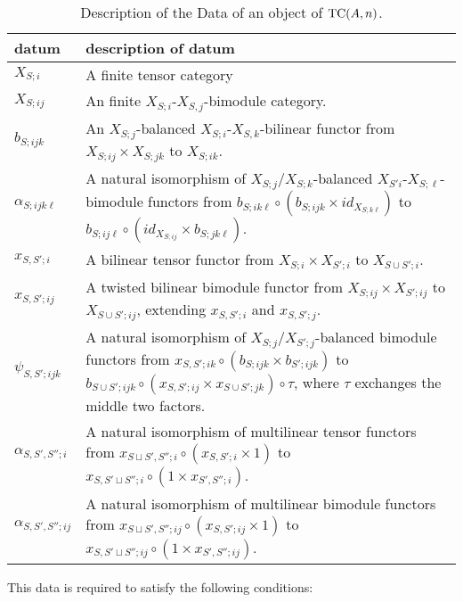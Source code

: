 \documentclass[a4paper]{amsart}
\begin{document}
\begin{table}[ht]
	\caption{Description of the Data of an object of $\mathrm{TC}(A,n)$.}	
	\begin{tabular}{l p{11cm}}
		datum & description of datum \\ \hline
		$X_{S;i}$ & A finite tensor category \\
		$X_{S;ij}$ & An finite $X_{S;i}$-$X_{S,j}$-bimodule category. \\
		$b_{S; ijk}$ & An $X_{S;j}$-balanced $X_{S;i}$-$X_{S,k}$-bilinear functor from $X_{S;ij}\times X_{S;jk}$ to $X_{S;ik}$. \\
		$\alpha_{S;ijk \ell}$  & A natural isomorphism of $X_{S;j}$/$X_{S;k}$-balanced $X_{S'i}$-$X_{S;\ell}$-bimodule functors from $b_{S;i k \ell} \circ (b_{S;ijk} \times id_{X_{S;k\ell}})$ to $b_{S;ij \ell} \circ (id_{X_{S;ij}} \times b_{S;jk\ell})$. \\ \hline
		$x_{S, S';i}$ & A bilinear tensor functor from $X_{S;i} \times X_{S';i}$ to $X_{S \cup S'; i}$. \\
		$x_{S, S';ij}$ & A twisted bilinear bimodule functor from $X_{S;ij} \times X_{S';ij}$ to $X_{S \cup S'; ij}$, extending $x_{S, S';i}$ and $x_{S, S';j}$. \\
		$\psi_{S, S'; i j k}$ & A natural isomorphism of $X_{S;j} / X_{S';j}$-balanced bimodule functors from $x_{S,S'; ik} \circ (b_{S; ijk} \times b_{S';ijk})$ to $b_{S \cup S'; ijk} \circ (x_{S,S';ij} \times x_{S \cup S'; jk}) \circ  \tau $, where $\tau$ exchanges the middle two factors.  \\ \hline
		$\alpha_{S, S', S'';i}$ & A natural isomorphism of multilinear tensor functors from
		$x_{S \sqcup S', S'';i}\circ (x_{S,S';i} \times 1)$  to 
		$x_{S, S' \sqcup S'';i} \circ (1 \times x_{S', S'';i})$. \\
		$\alpha_{S, S', S'';ij}$ & A natural isomorphism of multilinear bimodule functors from
		$x_{S \sqcup S', S'';ij}\circ (x_{S,S';ij} \times 1)$  to 
		$x_{S, S' \sqcup S'';ij} \circ (1 \times x_{S', S'';ij})$. \\
	\end{tabular}
	\label{Table:ObjectOfTC2}
\end{table}
This data is required to satisfy the following conditions: \\
\end{document}
